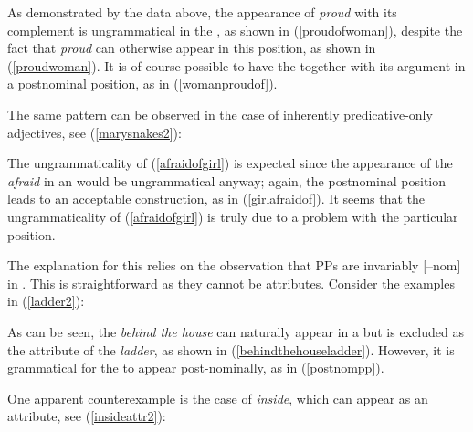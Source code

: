 \largerpage[1]
\ea \label{app2}
 \label{proudofwoman}
 \label{proudwoman}
 \label{womanproudof}
\z
\z

As demonstrated by the data above, the appearance of \textit{proud} with its  complement is ungrammatical in the , as shown in (\ref{proudofwoman}), despite the fact that \textit{proud} can otherwise appear in this position, as shown in (\ref{proudwoman}). It is of course possible to have the  together with its  argument in a postnominal position, as in (\ref{womanproudof}).

The same pattern can be observed in the case of inherently predicative-only adjectives, see (\ref{marysnakes2}):

\ea \label{marysnakes2}
 \label{afraidofgirl}
 \label{girlafraidof}
\z
\z

The ungrammaticality of (\ref{afraidofgirl}) is expected since the appearance of the  \textit{afraid} in an  would be ungrammatical anyway; again, the postnominal position leads to an acceptable construction, as in (\ref{girlafraidof}). It seems that the ungrammaticality of (\ref{afraidofgirl}) is truly due to a problem with the particular position.

The explanation for this relies on the observation that PPs are invariably \mbox{[--nom]} in . This is straightforward as they cannot be attributes. Consider the examples in (\ref{ladder2}):

\ea \label{ladder2}
 \label{behindthehouseladder}
 \label{postnompp}
\z
\z

As can be seen, the  \textit{behind the house} can naturally appear in a  but is excluded as the attribute of the  \textit{ladder}, as shown in (\ref{behindthehouseladder}). However, it is grammatical for the  to appear post-nominally, as in (\ref{postnompp}).

One apparent counterexample is the case of \textit{inside}, which can appear as an attribute, see (\ref{insideattr2}):


